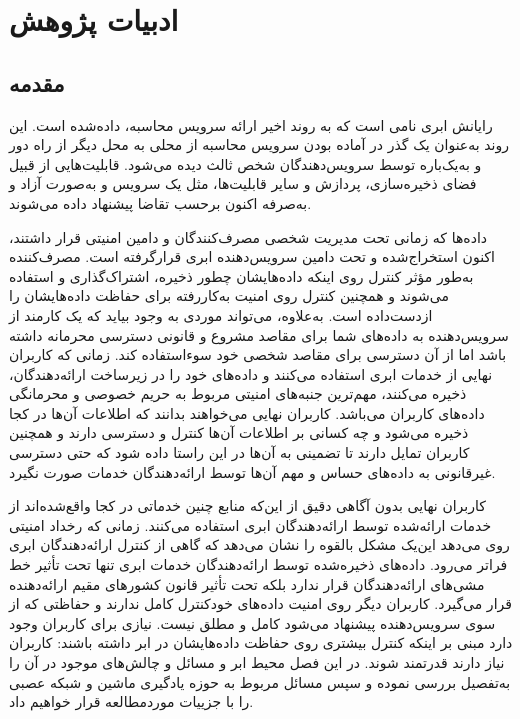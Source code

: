 \documentclass[a4paper,oneside,12pt]{report}
\begin{document}
\chapter{ادبیات پژوهش}
\section{مقدمه}
رایانش ابری نامی است که به روند اخیر ارائه سرویس محاسبه، داده‌شده است. این روند به‌عنوان یک گذر در آماده بودن سرویس محاسبه از محلی به محل دیگر از راه دور و به‌یک‌باره توسط سرویس‌دهندگان شخص ثالث دیده می‌شود. قابلیت‌هایی از قبیل فضای ذخیره‌سازی، پردازش و سایر قابلیت‌ها، مثل یک سرویس و به‌صورت آزاد و به‌صرفه اکنون برحسب تقاضا پیشنهاد داده می‌شوند.

داده‌ها که زمانی تحت مدیریت شخصی مصرف‌کنندگان و دامین امنیتی قرار داشتند، اکنون استخراج‌شده و تحت دامین سرویس‌دهنده ابری%
قرارگرفته است. مصرف‌کننده به‌طور مؤثر کنترل روی اینکه داده‌هایشان چطور ذخیره، اشتراک‌گذاری و استفاده می‌شوند و همچنین کنترل روی امنیت به‌کاررفته برای حفاظت داده‌هایشان را ازدست‌داده است. به‌علاوه، می‌تواند موردی به وجود بیاید که یک کارمند از سرویس‌دهنده به داده‌های شما برای مقاصد مشروع و قانونی دسترسی محرمانه داشته باشد اما از آن دسترسی برای مقاصد شخصی خود سوءاستفاده کند. زمانی که کاربران نهایی از خدمات ابری استفاده می‌کنند و داده‌های خود را در زیرساخت ارائه‌دهندگان، ذخیره می‌کنند، مهم‌ترین جنبه‌های امنیتی مربوط به حریم خصوصی و محرمانگی داده‌های کاربران می‌باشد. کاربران نهایی می‌خواهند بدانند که اطلاعات آن‌ها در کجا ذخیره می‌شود و چه کسانی بر اطلاعات آن‌ها کنترل و دسترسی دارند و همچنین کاربران تمایل دارند تا تضمینی به آن‌ها در این راستا داده شود که حتی دسترسی غیرقانونی به داده‌های حساس و مهم آن‌ها توسط ارائه‌دهندگان خدمات صورت نگیرد.

کاربران نهایی بدون آگاهی دقیق از این‌که منابع چنین خدماتی در کجا واقع‌شده‌اند از خدمات ارائه‌شده توسط ارائه‌دهندگان ابری استفاده می‌کنند. زمانی که رخداد امنیتی روی می‌دهد این‌یک مشکل بالقوه را نشان می‌دهد که گاهی از کنترل ارائه‌دهندگان ابری فراتر می‌رود. داده‌های ذخیره‌شده توسط ارائه‌دهندگان خدمات ابری تنها تحت تأثیر خط مشی‌های ارائه‌دهندگان قرار ندارد بلکه تحت تأثیر قانون کشورهای مقیم ارائه‌دهنده قرار می‌گیرد. کاربران دیگر روی امنیت داده‌های خودکنترل کامل ندارند و حفاظتی که از سوی سرویس‌دهنده پیشنهاد می‌شود کامل و مطلق نیست. نیازی برای کاربران وجود دارد مبنی بر اینکه کنترل بیشتری روی حفاظت داده‌هایشان در ابر داشته باشند: کاربران نیاز دارند قدرتمند شوند. در این فصل محیط ابر و مسائل و چالش‌های موجود در آن را به‌تفصیل بررسی نموده و سپس مسائل مربوط به حوزه یادگیری ماشین و شبکه عصبی را با جزییات موردمطالعه قرار خواهیم داد.
\end{document}

